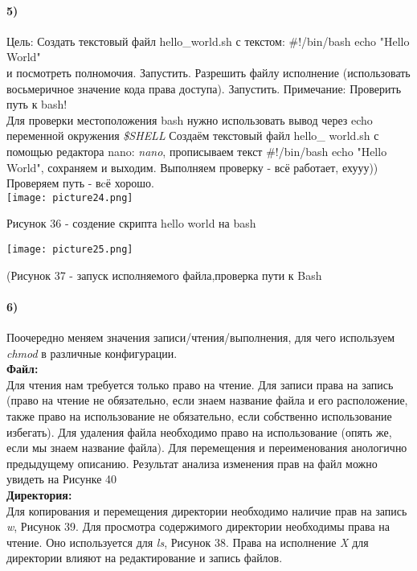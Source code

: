 		\paragraph{5)}
		Цель: Создать текстовый файл hello\_world.sh с текстом: \#!/bin/bash echo "Hello World"\\

и посмотреть полномочия. Запустить. Разрешить файлу исполнение (использовать восьмеричное значение кода права доступа). Запустить. Примечание: Проверить путь к bash! 
	\\
		Для проверки местоположения bash нужно использовать вывод через echo переменной окружения \textit{\$SHELL}
		Создаём текстовый файл hello\_ world.sh с помощью редактора nano: 				\textit{nano}, прописываем текст \#!/bin/bash echo "Hello World", сохраняем и 		выходим. Выполняем проверку - всё работает, ехууу)) Проверяем путь - вcё хорошо.		\\
	\texttt{[image: picture24.png]}\\
		\centerline{Рисунок 36 - создение скрипта hello world на bash}

	\begin{center}
		\texttt{[image: picture25.png]}\\
			\centerline{(Рисунок 37 - запуск исполняемого файла,проверка пути к Bash}

	\end{center}
	
		\paragraph{6)}
		Поочередно меняем значения записи/чтения/выполнения, для чего используем 		\textit{chmod} в различные конфигурации. \\
		\textbf{Файл:}\\
		Для чтения нам требуется только право на чтение. Для записи права на запись (право на чтение не обязательно, если знаем название файла и его расположение, также право на использование не обязательно, если собственно использование избегать). Для удаления файла необходимо право на использование (опять же, если мы знаем название файла). Для перемещения и переименования анологично предыдущему описанию. Результат анализа изменения прав на файл можно увидеть на Рисунке 40\\
		\textbf{Директория:}\\
		Для копирования и перемещения директории необходимо наличие прав на запись \textit{w}, Рисунок 39.
		Для просмотра содержимого директории необходимы права на чтение. Оно используется для \textit{ls}, Рисунок 38.
		Права на исполнение \textit{X} для директории влияют на редактирование и запись файлов.

